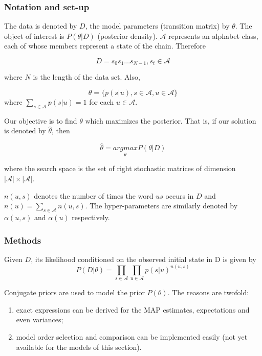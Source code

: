 \documentclass[
  nojss]{jss}
\providecommand{\tightlist}{%
  \setlength{\itemsep}{0pt}\setlength{\parskip}{0pt}}
\begin{document}
\subsubsection{Notation and set-up}\label{notation-and-set-up}

The data is denoted by \(D\), the model parameters (transition matrix) by \(\theta\). The object of interest is \(P(\theta | D)\) (posterior density). \(\mathcal{A}\) represents an alphabet class, each of whose members represent a state of the chain. Therefore

\[D = s_0 s_1 ... s_{N-1}, s_t \in \mathcal{A}\]

where \(N\) is the length of the data set. Also,

\[\theta = \{p(s|u), s \in \mathcal{A}, u \in \mathcal{A}  \}\]
where \(\sum_{s \in \mathcal{A}} p(s|u) = 1\) for each \(u \in \mathcal{A}\).

Our objective is to find \(\theta\) which maximizes the posterior. That is, if our solution is denoted by \(\hat{\theta}\), then

\[\hat{\theta} = \underset{\theta}{argmax}P(\theta | D)\]

where the search space is the set of right stochastic matrices of dimension \(|\mathcal{A}| \times |\mathcal{A}|\).

\(n(u, s)\) denotes the number of times the word \(us\) occurs in \(D\) and \(n(u)=\sum_{s \in \mathcal{A}}n(u, s)\). The hyper-parameters are similarly denoted by \(\alpha(u, s)\) and \(\alpha(u)\) respectively.

\subsubsection{Methods}\label{methods}

Given \(D\), its likelihood conditioned on the observed initial state in D is given by
\[P(D|\theta) = \prod_{s \in \mathcal{A}} \prod_{u \in \mathcal{A}} p(s|u)^{n(u, s)}\]

Conjugate priors are used to model the prior \(P(\theta)\). The reasons are twofold:

\begin{enumerate}
\def\labelenumi{\arabic{enumi}.}
\tightlist
\item
  exact expressions can be derived for the MAP estimates, expectations and even variances;
\item
  model order selection and comparison can be implemented easily (not yet available for the models of this section).
\end{enumerate}
\end{document}
